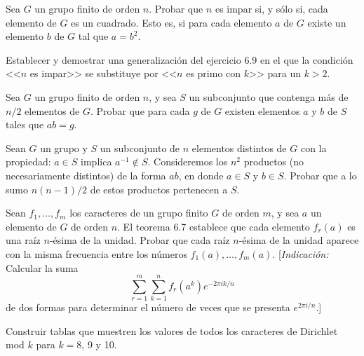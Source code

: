 \documentclass[12pt,a4paper]{book}
\begin{document}
    \begin{ejercicio}
        Sea $G$ un grupo finito de orden $n$. Probar que $n$ es impar si, y sólo si, cada
        elemento de $G$ es un cuadrado. Esto es, si para cada elemento $a$ de $G$ existe un
        elemento $b$ de $G$ tal que $a=b^{2}$.
    \end{ejercicio}

    \begin{ejercicio}
        Establecer y demostrar una generalización del ejercicio 6.9 en el que la condición
        <<$n$ es impar>> se substituye por <<$n$ es primo con $k$>> para un $k>2$.
    \end{ejercicio}

    \begin{ejercicio}
        Sea $G$ un grupo finito de orden $n$, y sea $S$ un subconjunto que contenga más de
        $n/2$ elementos de $G$. Probar que para cada $g$ de $G$ existen elementos $a$ y $b$
        de $S$ tales que $ab=g$.
    \end{ejercicio}

    \begin{ejercicio}
        Sean $G$ un grupo y $S$ un subconjunto de $n$ elementos distintos de $G$ con la
        propiedad: $a\in S$ implica $a^{-1}\notin S$. Consideremos los $n^{2}$ productos (no
        necesariamente distintos) de la forma $ab$, en donde $a\in S$ y $b\in S$. Probar
        que a lo sumo $n(n-1)/2$ de estos productos pertenecen a $S$.
    \end{ejercicio}

    \begin{ejercicio}
        Sean $f_{1},\dots,f_{m}$ los caracteres de un grupo finito $G$ de orden $m$, y sea $a$
        un elemento de $G$ de orden $n$. El teorema 6.7 establece que cada elemento
        $f_{r}(a)$ es una raíz $n$-ésima de la unidad. Probar que cada raíz $n$-ésima de la
        unidad aparece con la misma frecuencia entre los números $f_{1}(a),\dots,f_{m}(a)$.
        [\textit{Indicación:} Calcular la suma
        \begin{equation*}
            \sum_{r=1}^{m}\sum_{k=1}^{n}f_{r}(a^{k})e^{-2\pi ik/n}
        \end{equation*}
        de dos formas para determinar el número de veces que se presenta $e^{2\pi i/n}$.]
    \end{ejercicio}

    \begin{ejercicio}
        Construir tablas que muestren los valores de todos los caracteres de Dirichlet mod
        $k$ para $k=8$, 9 y 10.
    \end{ejercicio}
\end{document}
